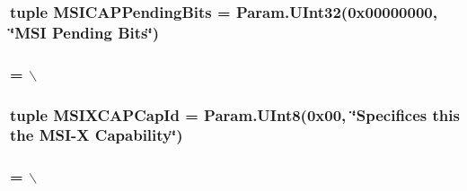 \label{classPci_1_1PciDevice_a4f1b67a85cdaf32ce2e152793bcae158}
\hypertarget{classPci_1_1PciDevice_a1e551eca59d7e257c765befbfd09f569}{
\subsubsection[{MSICAPPendingBits}]{\setlength{\rightskip}{0pt plus 5cm}tuple {\bf MSICAPPendingBits} = Param.UInt32(0x00000000, \char`\"{}MSI Pending Bits\char`\"{})}}
\label{classPci_1_1PciDevice_a1e551eca59d7e257c765befbfd09f569}
\hypertarget{classPci_1_1PciDevice_a07a507adc2b79cf78adec9662343f0fe}{
\subsubsection[{MSIXCAPBaseOffset}]{ = $\backslash$}}
\label{classPci_1_1PciDevice_a07a507adc2b79cf78adec9662343f0fe}
\hypertarget{classPci_1_1PciDevice_ae90ae10699fd4e465796629b41df21bb}{
\subsubsection[{MSIXCAPCapId}]{\setlength{\rightskip}{0pt plus 5cm}tuple {\bf MSIXCAPCapId} = Param.UInt8(0x00, \char`\"{}Specifices this the MSI-\/X Capability\char`\"{})}}
\label{classPci_1_1PciDevice_ae90ae10699fd4e465796629b41df21bb}
\hypertarget{classPci_1_1PciDevice_a6a52f9ecc10f528668ebfaf713c55e2a}{
\subsubsection[{MSIXCAPNextCapability}]{ = $\backslash$}}
